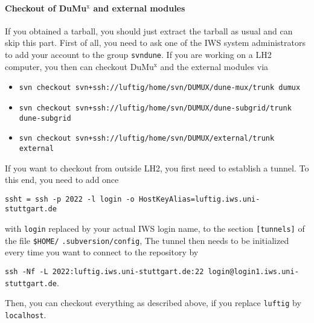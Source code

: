 \paragraph{Checkout of DuMu$^\text{x}$ and external modules} 
If you obtained a \Dumux tarball, you should just extract the tarball as usual 
and can skip this part. 
First of all, you need to ask one of the IWS system administrators to 
add your account to the group \texttt{svndune}. 
If you are working on a LH2 computer, you then can checkout DuMu$^\text{x}$ 
and the external modules via 
\begin{itemize}
\item \texttt{svn checkout svn+ssh://luftig/home/svn/DUMUX/dune-mux/trunk dumux}
\item \texttt{svn checkout svn+ssh://luftig/home/svn/DUMUX/dune-subgrid/trunk dune-subgrid}
\item \texttt{svn checkout svn+ssh://luftig/home/svn/DUMUX/external/trunk external}
\end{itemize} 
If you want to checkout from outside LH2, you first need to establish a tunnel. 
To this end, you need to add once 
\begin{center}
\texttt{ssht = ssh -p 2022 -l login -o HostKeyAlias=luftig.iws.uni-stuttgart.de} 
\end{center}
with \texttt{login} replaced 
by your actual IWS login name, to the section \texttt{[tunnels]} of the 
file \texttt{\$HOME/} \texttt{.subversion/config}, 
The tunnel then needs to be initialized every time you want 
to connect to the repository by 
\begin{center}
\texttt{ssh -Nf -L 2022:luftig.iws.uni-stuttgart.de:22 login@login1.iws.uni-stuttgart.de}.
\end{center}
Then, you can checkout everything as described above, if you replace \texttt{luftig} 
by \texttt{localhost}. 


